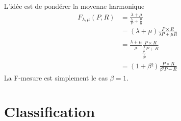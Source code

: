 \documentclass[xcolor={svgnames}, french]{beamer}
\begin{document}
\begin{frame}[fragile=singleslide]
	L'idée est de pondérer la moyenne harmonique
	\begin{align}
		F_{λ, μ}(P, R)
			&= \frac{λ+μ}{\frac{λ}{P}+\frac{μ}{R}}\\
			&= (λ+μ) \frac{P×R}{λP + μR}\\
			&= \frac{λ+μ}{μ} \frac{P×R}{\underbrace{\frac{λ}{μ}}_{β²}P + R}\\
			&= (1+β²)\frac{P×R}{β²P + R}
	\end{align}
	La F-mesure est simplement le cas $β=1$.
\end{frame}



\section{Classification}
\end{document}
